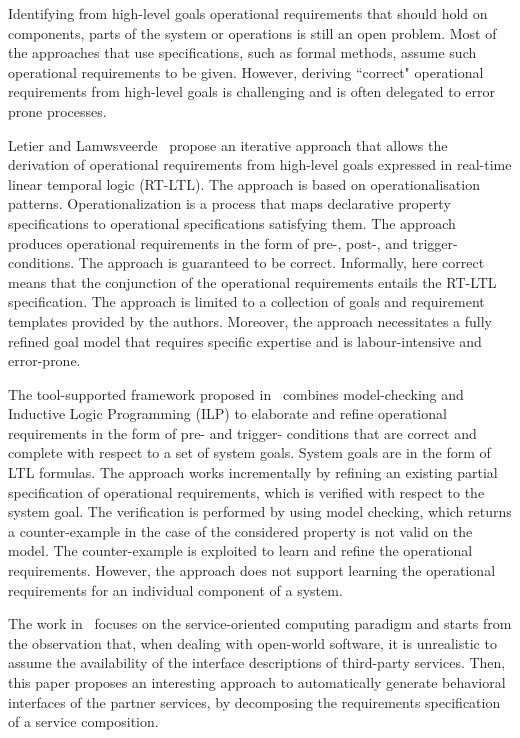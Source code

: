 \documentclass[sigconf,review, anonymous]{acmart}
\begin{document}
Identifying from high-level goals operational requirements that should hold on components, parts of the system or operations is still an open problem. Most of the approaches that use specifications, such as formal methods, assume such operational requirements to be given. However, deriving ``correct" operational requirements from high-level goals is challenging and is often delegated to error prone processes. 

Letier and Lamwsveerde~\cite{LL02} propose an iterative approach that allows the derivation of operational requirements from high-level goals expressed in real-time linear temporal logic (RT-LTL). The approach is based on operationalisation patterns. Operationalization is a process that maps declarative property specifications to operational specifications satisfying them. The approach produces operational requirements in the form of pre-, post-, and trigger- conditions. The approach is guaranteed to be correct. Informally, here correct means that the conjunction of the operational requirements entails the RT-LTL specification. The approach is limited to a collection of goals and requirement templates provided by the authors. Moreover, the approach necessitates a fully refined goal model that requires specific expertise and is labour-intensive and error-prone.  

The tool-supported framework proposed in~\cite{AKRU99,ARRU09} combines model-checking and Inductive Logic Programming (ILP) to elaborate and refine operational requirements in the form of pre- and trigger- conditions that are correct and complete with respect to a set of system goals. System goals are in the form of LTL formulas. The approach works incrementally by refining an existing partial specification of operational requirements, which is verified with respect to the system goal. The verification is performed by using model checking, which returns a counter-example in the case of the considered property is not valid on the model. The counter-example is exploited to learn and refine the operational requirements. However, the approach
does not support learning the operational requirements for
an individual component of a system.

The work in~\cite{Bianculli2011} focuses on the service-oriented computing paradigm and starts from the observation that, when dealing with
open-world software, it is unrealistic to assume the
availability of the interface descriptions of third-party services. Then, this paper proposes an interesting approach 
to automatically generate behavioral interfaces of the partner services, by decomposing
the requirements specification of a service composition.
\end{document}
